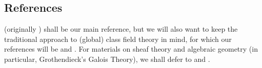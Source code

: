         \subsection{References}
    	    \cite{tendler_2015_geometric_class_field_theory} (originally \cite{tendler_2010_geometric_class_field_theory_original}) shall be our main reference, but we will also want to keep the traditional approach to (global) class field theory in mind, for which our references will be \cite[Chapter VI]{neukirch_2010_algebraic_number_theory} and \cite[Chapter VIII]{neukirch_1999_cohomology_of_number_field}. For materials on sheaf theory and algebraic geometry (in particular, Grothendieck's Galois Theory), we shall defer to \cite{stacks} and \cite[Expos\'e V]{SGA1}. 
    	    
	\printbibliography

